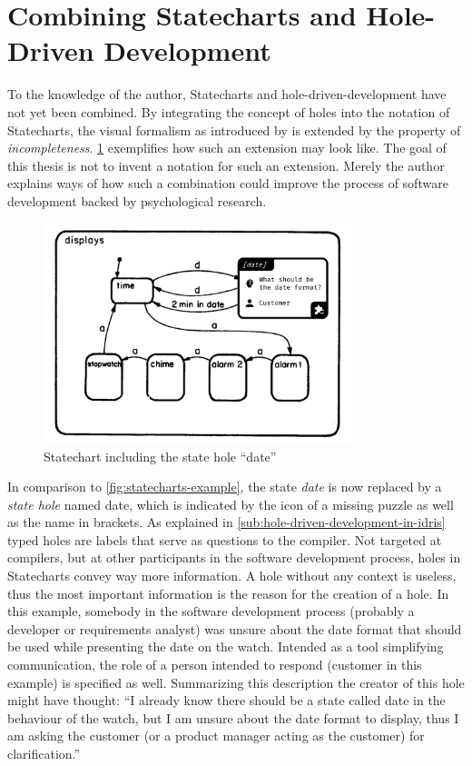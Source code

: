 \section{Combining Statecharts and Hole-Driven Development}
\label{sec:combining-statecharts-and-hole-driven-development}
To the knowledge of the author, Statecharts and hole-driven-development have not yet been combined.
By integrating the concept of holes into the notation of Statecharts, the visual formalism as introduced by \textcite{harel_statecharts:_1987} is extended by the property of \emph{incompleteness}.
\cref{fig:statecharts-hole-example} exemplifies how such an extension may look like.
The goal of this thesis is not to invent a notation for such an extension.
Merely the author explains ways of how such a combination could improve the process of software development backed by psychological research.
\begin{figure}[h]
\centering
\includegraphics[width=0.8\textwidth]{images/statechart-hole-example}
\caption{Statechart including the state hole ``date''}
\label{fig:statecharts-hole-example}
\end{figure}
In comparison to \cref{fig:statecharts-example}, the state \emph{date} is now replaced by a \emph{state hole} named date, which is indicated by the icon of a missing puzzle as well as the name in brackets.
As explained in \cref{sub:hole-driven-development-in-idris} typed holes are labels that serve as questions to the compiler.
Not targeted at compilers, but at other participants in the software development process, holes in Statecharts convey way more information.
A hole without any context is useless, thus the most important information is the reason for the creation of a hole.
In this example, somebody in the software development process (probably a developer or requirements analyst) was unsure about the date format that should be used while presenting the date on the watch.
Intended as a tool simplifying communication, the role of a person intended to respond (customer in this example) is specified as well.
Summarizing this description the creator of this hole might have thought: ``I already know there should be a state called date in the behaviour of the watch, but I am unsure about the date format to display, thus I am asking the customer (or a product manager acting as the customer) for clarification.''

